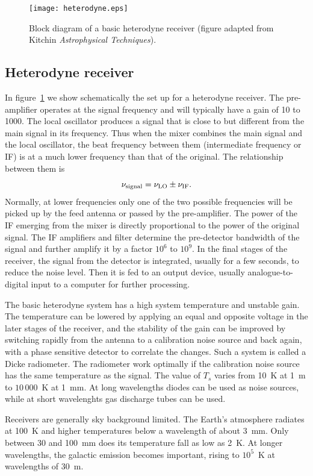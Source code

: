 \begin{figure}[h]
  \centering
	\texttt{[image: heterodyne.eps]}
  \caption{Block diagram of a basic heterodyne receiver (figure adapted from Kitchin {\it
Astrophysical Techniques}).}
  \label{fig:heterodyne}
\end{figure}


\subsection{Heterodyne receiver}
In figure~\ref{fig:heterodyne} we show schematically the set up for a heterodyne receiver. The
pre-amplifier operates at the signal frequency and will typically have a gain of 10 to 1000. The
local oscillator produces a signal that is close to but different from the main signal in its 
frequency. Thus when the mixer combines the main signal and the local oscillator, the beat 
frequency between them (intermediate frequency or IF) is at a much lower frequency than that of
the original. The relationship between them is 
\[
\nu_{\rm signal}=\nu_{\rm LO}\pm\nu_{\rm IF}.
\]
Normally, at lower frequencies only one of the two possible frequencies will be picked up by 
the feed antenna or passed by the pre-amplifier. The power of the IF emerging from the mixer
is directly proportional to the power of the original signal. The IF amplifiers and filter 
determine the pre-detector bandwidth of the signal and further amplify it by a factor $10^6$ to
$10^9$. In the final stages of the receiver, the signal from the detector is integrated, usually for
a few seconds, to reduce the noise level. Then it is fed to an output device, usually 
analogue-to-digital input to a computer for further processing.

The basic heterodyne system has a high system temperature and unstable gain.
The temperature can be lowered by applying an equal and opposite voltage in the
later stages of the receiver, and the stability of the gain can be improved by
switching rapidly from the antenna to a calibration noise source and back again, 
with a phase sensitive detector to correlate the changes. Such a system is called 
a Dicke radiometer. The radiometer work optimally if the calibration noise source
has the same temperature as the signal. The value of $T_s$ varies from 10~K at 
1~m to $10\,000$~K at 1~mm. At long wavelengths diodes can be used as noise 
sources, while at short wavelenghts gas discharge tubes can be used.

Receivers are generally sky background limited. The Earth's atmosphere 
radiates at 100~K and higher temperatures below a wavelength of about
3~mm. Only between 30 and 100~mm does its temperature fall as low as 
2~K. At longer wavelengths, the galactic emission becomes important, rising
to $10^5$~K at wavelengths of 30~m.

